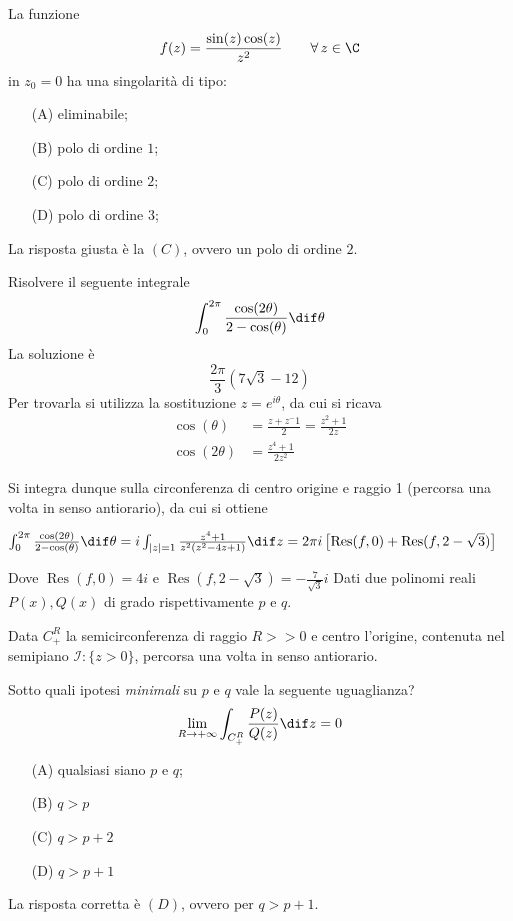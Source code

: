     La funzione \[f(z)=\frac{\sin(z)\cos(z)}{z^2}\qquad \forall\, z\in\C\]in $z_0=0$ ha una singolarità di tipo:
    \begin{itemize}
        \item[(A)] eliminabile;
        \item[(B)] polo di ordine $ 1 $; 
        \item[(C)] polo di ordine $ 2 $;
        \item[(D)] polo di ordine $ 3 $;
    \end{itemize}
    La risposta giusta è la $ (C) $, ovvero un polo di ordine $ 2 $.

    Risolvere il seguente integrale \[\int_0^{2 \pi} \frac{\cos(2\theta)}{2 - \cos(\theta)}\dif \theta\]
    La soluzione è \[
        \frac{2 \pi}{3}(7 \sqrt{3} -12 )
    \]Per trovarla si utilizza la sostituzione $z = e^{i \theta}$, da cui si ricava
    \begin{align*}
        \cos(\theta) &= \frac{z + z^-1}{2} = \frac{z^2+1}{2z}\\
        \cos(2\theta) &= \frac{z^4+1}{2z^2}
    \end{align*}

    Si integra dunque sulla circonferenza di centro origine e raggio 1 (percorsa una volta in senso antiorario), da cui si ottiene

        $\int_0^{2 \pi} \frac{\cos(2\theta)}{2 - \cos(\theta)}\dif \theta = i \int_{|z| = 1} \frac{z^4+1}{z^2(z^2-4z+1)} \dif z = 2 \pi i \left[ \operatorname{Res}(f,0) + \operatorname{Res}(f,2-\sqrt{3}) \right]$

    Dove $\operatorname{Res}(f,0) = 4i$ e $ \operatorname{Res}(f,2-\sqrt{3}) = -\frac{7}{\sqrt{3}}i $
Dati due polinomi reali $P(x), Q(x)$ di grado rispettivamente $p$ e $q$. 
    
Data $C^{R}_{+}$ la semicirconferenza di raggio $R>>0$ e centro l'origine, contenuta nel semipiano $\mathcal{I}:\{z>0\}$, percorsa una volta in senso antiorario. 

Sotto quali ipotesi \emph{minimali} su $p$ e $q$ vale la seguente uguaglianza? \[
    \lim_{R\to+\infty}\int_{C^{R}_{+}}\frac{P(z)}{Q(z)}\dif z = 0
\]
\begin{itemize}
    \item[(A)] qualsiasi siano $ p $ e $ q $; 
    \item[(B)] $ q>p $
    \item[(C)] $ q>p+2 $
    \item[(D)] $ q> p+1 $
\end{itemize}
    La risposta corretta è $ (D) $, ovvero per $ q>p+1 $.
